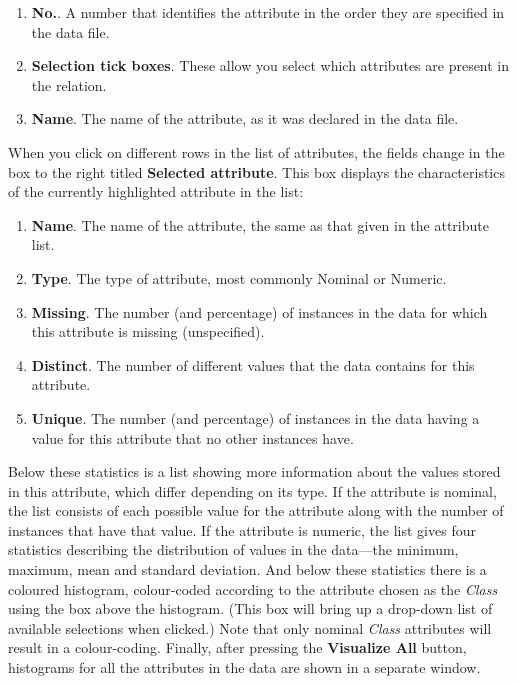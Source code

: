 \documentclass[a4paper]{article}
\begin{document}
\begin{enumerate}
\item \textbf{No.}.
A number that identifies the attribute in the order they are specified in the
data file. 
\item \textbf{Selection tick boxes}.
These allow you select which attributes are present in the relation.
\item \textbf{Name}.
The name of the attribute, as it was declared in the data file.
\end{enumerate}

When you click on different rows in the list of attributes, the fields
change in the box to the right titled \textbf{Selected
attribute}. This box displays the characteristics of the currently
highlighted attribute in the list:

\begin{enumerate}
\item \textbf{Name}.
The name of the attribute, the same as that given in the attribute list.
\item \textbf{Type}.
The type of attribute, most commonly Nominal or Numeric.
\item \textbf{Missing}.
The number (and percentage) of instances in the data for which this attribute
is missing (unspecified).
\item \textbf{Distinct}.
The number of different values that the data contains for this attribute.
\item \textbf{Unique}.
The number (and percentage) of instances in the data having a value for this
attribute that no other instances have.
\end{enumerate}
\noindent
Below these statistics is a list showing more information about the
values stored in this attribute, which differ depending on its type.
If the attribute is nominal, the list consists of each possible value
for the attribute along with the number of instances that have that
value.  If the attribute is numeric, the list gives four statistics
describing the distribution of values in the data---the minimum,
maximum, mean and standard deviation.  And below these statistics
there is a coloured histogram, colour-coded according to the attribute
chosen as the {\it Class} using the box above the histogram. (This box
will bring up a drop-down list of available selections when clicked.)
Note that only nominal {\it Class} attributes will result in a
colour-coding.  Finally, after pressing the \textbf{Visualize All}
button, histograms for all the attributes in the data are shown in a
separate window.
\end{document}
